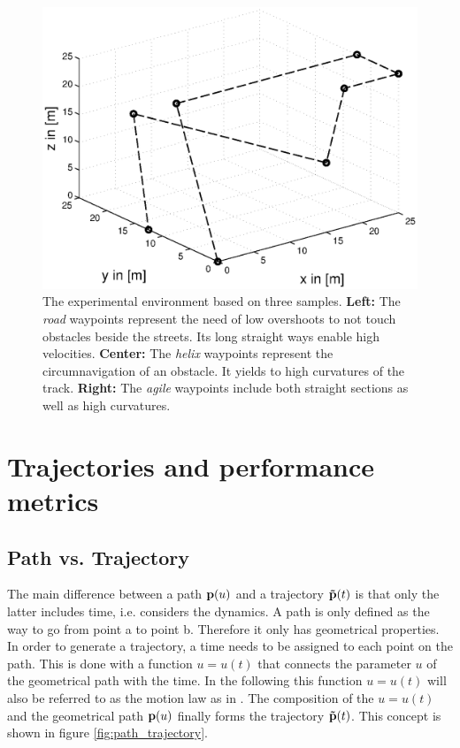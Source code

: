 \begin{figure}[h]
\begin{minipage}[t]{0.32\textwidth}
    \includegraphics[width = \textwidth]{graphics/sampleNodeAgile}
  \end{minipage}
  \caption{The experimental environment based on three samples. {\bf Left:} The \textit{road} waypoints represent the need of low overshoots to not touch obstacles beside the streets. Its long straight ways enable high velocities. {\bf Center:} The \textit{helix} waypoints represent the circumnavigation of an obstacle. It yields to high curvatures of the track. {\bf Right:} The \textit{agile} waypoints include both straight sections as well as high curvatures.}
  \label{fig:sampleNodes}
\end{figure}

\section{Trajectories and performance metrics}
\label{sec:definition}
\subsection{Path vs. Trajectory}
The main difference between a path $ {\bf p}(u)$ and a trajectory $ {\bf \tilde{p}}(t)$ is that only the latter includes time, i.e. considers the dynamics. A path is only defined as the way to go from point a to point b. Therefore it only has geometrical properties. In order to generate a trajectory, a time needs to be assigned to each point on the path. This is done with a function $u=u(t)$ that connects the parameter $u$ of the geometrical path with the time. In the following this function $u=u(t)$ will also be referred to as the motion law as in \cite{snider}. The composition of the $u=u(t)$ and the geometrical path ${\bf p}(u)$ finally forms the trajectory ${\bf \tilde{p}}(t)$. This concept is shown in figure \ref{fig:path_trajectory}.


